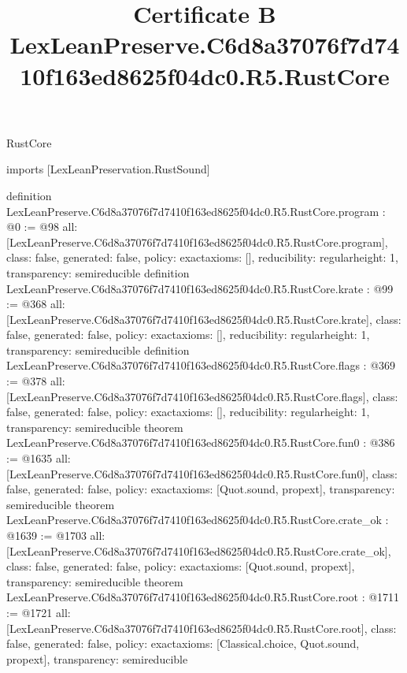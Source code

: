 \begin{lexlean}{RustCore}
\title{Certificate B LexLeanPreserve.C6d8a37076f7d7410f163ed8625f04dc0.R5.RustCore}
\begin{coremodule}
imports [LexLeanPreservation.RustSound]

definition LexLeanPreserve.C6d8a37076f7d7410f163ed8625f04dc0.R5.RustCore.program : @0 := @98 {
  all: [LexLeanPreserve.C6d8a37076f7d7410f163ed8625f04dc0.R5.RustCore.program],
  class: false,
  generated: false,
  policy: exact{axioms: []},
  reducibility: regular{height: 1},
  transparency: semireducible
}
definition LexLeanPreserve.C6d8a37076f7d7410f163ed8625f04dc0.R5.RustCore.krate : @99 := @368 {
  all: [LexLeanPreserve.C6d8a37076f7d7410f163ed8625f04dc0.R5.RustCore.krate],
  class: false,
  generated: false,
  policy: exact{axioms: []},
  reducibility: regular{height: 1},
  transparency: semireducible
}
definition LexLeanPreserve.C6d8a37076f7d7410f163ed8625f04dc0.R5.RustCore.flags : @369 := @378 {
  all: [LexLeanPreserve.C6d8a37076f7d7410f163ed8625f04dc0.R5.RustCore.flags],
  class: false,
  generated: false,
  policy: exact{axioms: []},
  reducibility: regular{height: 1},
  transparency: semireducible
}
theorem LexLeanPreserve.C6d8a37076f7d7410f163ed8625f04dc0.R5.RustCore.fun0 : @386 := @1635 {
  all: [LexLeanPreserve.C6d8a37076f7d7410f163ed8625f04dc0.R5.RustCore.fun0],
  class: false,
  generated: false,
  policy: exact{axioms: [Quot.sound, propext]},
  transparency: semireducible
}
theorem LexLeanPreserve.C6d8a37076f7d7410f163ed8625f04dc0.R5.RustCore.crate_ok : @1639 := @1703 {
  all: [LexLeanPreserve.C6d8a37076f7d7410f163ed8625f04dc0.R5.RustCore.crate_ok],
  class: false,
  generated: false,
  policy: exact{axioms: [Quot.sound, propext]},
  transparency: semireducible
}
theorem LexLeanPreserve.C6d8a37076f7d7410f163ed8625f04dc0.R5.RustCore.root : @1711 := @1721 {
  all: [LexLeanPreserve.C6d8a37076f7d7410f163ed8625f04dc0.R5.RustCore.root],
  class: false,
  generated: false,
  policy: exact{axioms: [Classical.choice, Quot.sound, propext]},
  transparency: semireducible
}


\end{coremodule}
\end{lexlean}
